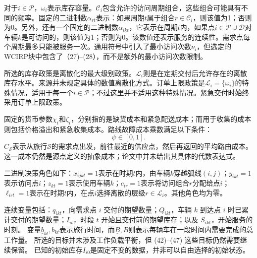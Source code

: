 \documentclass[10pt]{article}
\begin{document}
对于$i\in\mathcal P$，$\omega_i$表示库存容量。$\mathcal C_i$包含允许的访问周期组合，这些组合可能具有不同的频率。固定的二进制数$\alpha_{rt}$表示：如果周期$t$属于组合$r\in\mathcal C_i$，则该值为1；否则为0。另外，还有一个固定的二进制数$\alpha_{ikt}$，它表示在周期$t$内，如果点$i\in\mathcal P\cup\mathcal D$对车辆$k$是可访问的，则该值为1；否则为0。该数值还表示服务的连续性。需求点每个周期最多只能被服务一次。通用符号中引入了最小访问次数$\nu_i$，但选定的WCIRP块中包含了（27)--(28），而不是额外的最小访问次数限制。

所选的库存政策是离散化的最大级别政策。$\mathcal L_i$则是在定期交付后允许存在的离散库存水平。来源并未规定具体的数值离散化方式。订单上限政策是$\mathcal L_i=\{\omega_i\}$的特殊情况，适用于每一个$i\in\mathcal P$；不过这里并不适用这种特殊情况。紧急交付时始终采用订单上限政策。

固定的货币参数$\chi_i$和$\zeta_i$，分别指的是缺货成本和紧急配送成本；而用于收集的成本则包括价格溢出和紧急收集成本。路线故障成本乘数满足以下条件：
\[
\psi\in[0,1].
\]
$C_{\mathcal S}$表示从旅行$\mathcal S$的需求点出发，前往最近的供应点，然后再返回的平均路由成本。这一成本仍然是源点定义的抽象成本；论文中并未给出其具体的代数表达式。

二进制决策角色如下：$x_{ijkt}=1$表示在时期$t$内，由车辆$k$穿越弧线$(i,j)$；$y_{ikt}=1$表示访问点$i$；$z_{kt}=1$表示使用车辆$k$；$c_{ir}=1$表示将访问组合$r$分配给点$i$；$\ell_{irt}=1$表示在时期$t$内，在点$i$选择离散的层级$r\in\mathcal L_i$。其他角色均为零。

连续变量包括：$q_{ikt}$，向需求点 $i$ 交付的期望数量；$Q_{ikt}$，车辆 $k$ 到达点 $i$ 时已累计交付的期望数量；$I_{it}$，时段 $t$ 开始且交付前的期望库存；以及 $S_{ikt}$，开始服务的时刻。 变量$\underline b_{kt},\bar b_{kt}$表示旅行时间，而$\underline B,\bar B$则表示每辆车在一段时间内需要完成的总工作量。 所选的目标并未涉及工作负载平衡，但 (42)–(47) 这些目标仍然需要继续保留。 已知的初始库存$I_{i0}$是固定不变的数据，并非可以自由选择的初始状态。
\end{document}
